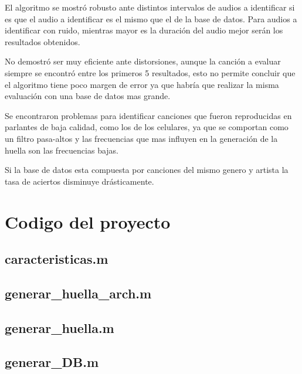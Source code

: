 \documentclass[10pt,spanish,a4paper,openany,notitlepage]{article}
\begin{document}
El algoritmo se mostró robusto ante distintos intervalos de audios a identificar
si es que el audio a identificar es el mismo que el de la base de datos.
Para audios a identificar con ruido, mientras mayor es la duración del audio
mejor serán los resultados obtenidos.

No demostró ser muy eficiente ante distorsiones, aunque la
canción a evaluar siempre se encontró entre los primeros 5 resultados,
esto no permite concluir que el algoritmo tiene poco margen de error
ya que habría que realizar la misma evaluación con una base de datos mas
grande.

Se encontraron problemas para identificar canciones que fueron reproducidas
en parlantes de baja calidad, como los de los celulares, ya que se comportan
como un filtro pasa-altos y las frecuencias que mas influyen en la generación
de la huella son las frecuencias bajas.

Si la base de datos esta compuesta por canciones del mismo genero y artista
la tasa de aciertos disminuye drásticamente.

\appendix

\newpage
\section{Codigo del proyecto}

\subsection{caracteristicas.m}
\label{codigo:caracteristicas}


\newpage
\subsection{generar\_huella\_arch.m}
\label{codigo:generar_huella_arch}


\subsection{generar\_huella.m}
\label{codigo:generar_huella}


\newpage
\subsection{generar\_DB.m}
\label{codigo:generar_DB}

\end{document}
